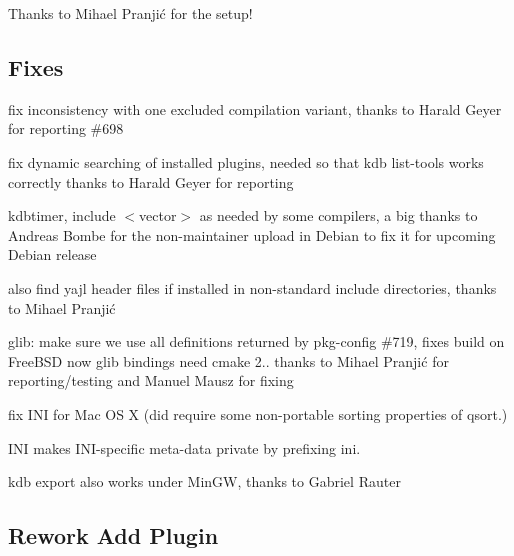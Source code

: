 Thanks to Mihael Pranjić for the setup!

\subsection*{Fixes}


\begin{DoxyItemize}
\item fix inconsistency with one excluded compilation variant, thanks to Harald Geyer for reporting \#698
\item fix dynamic searching of installed plugins, needed so that kdb list-\/tools works correctly thanks to Harald Geyer for reporting
\item kdbtimer, {\ttfamily include $<$vector$>$} as needed by some compilers, a big thanks to Andreas Bombe for the non-\/maintainer upload in Debian to fix it for upcoming Debian release
\item also find yajl header files if installed in non-\/standard include directories, thanks to Mihael Pranjić
\item glib\+: make sure we use all definitions returned by pkg-\/config \#719, fixes build on Free\+B\+S\+D now glib bindings need cmake 2.. thanks to Mihael Pranjić for reporting/testing and Manuel Mausz for fixing
\item fix I\+N\+I for Mac O\+S X (did require some non-\/portable sorting properties of {\ttfamily qsort}.)
\item I\+N\+I makes I\+N\+I-\/specific meta-\/data private by prefixing {\ttfamily ini}.
\item {\ttfamily kdb export} also works under Min\+G\+W, thanks to Gabriel Rauter
\end{DoxyItemize}

\subsection*{Rework Add Plugin}


